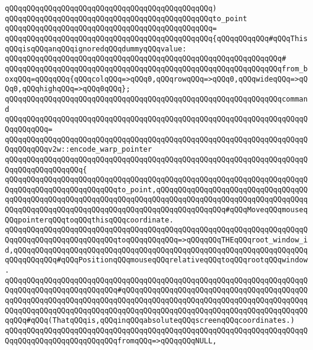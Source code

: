 \verb|qQQqqQQqqQQqqQQqqQQqqQQqqQQqqQQqqQQqqQQqqQQqqQQq)|\newline
\verb|qQQqqQQqqQQqqQQqqQQqqQQqqQQqqQQqqQQqqQQqqQQqqQQqto_point|\newline
\verb|qQQqqQQqqQQqqQQqqQQqqQQqqQQqqQQqqQQqqQQqqQQqqQQq=|\newline
\verb|qQQqqQQqqQQqqQQqqQQqqQQqqQQqqQQqqQQqqQQqqQQqqQQq{qQQqqQQqqQQq#qQQqThisqQQqisqQQqanqQQqignoredqQQqdummyqQQqvalue:|\newline
\verb|qQQqqQQqqQQqqQQqqQQqqQQqqQQqqQQqqQQqqQQqqQQqqQQqqQQqqQQqqQQqqQQq#|\newline
\verb|qQQqqQQqqQQqqQQqqQQqqQQqqQQqqQQqqQQqqQQqqQQqqQQqqQQqqQQqqQQqqQQqfrom_boxqQQq=qQQqqQQq{qQQqcolqQQq=>qQQq0,qQQqrowqQQq=>qQQq0,qQQqwideqQQq=>qQQq0,qQQqhighqQQq=>qQQq0qQQq};|\newline
\newline
\verb|qQQqqQQqqQQqqQQqqQQqqQQqqQQqqQQqqQQqqQQqqQQqqQQqqQQqqQQqqQQqqQQqcommand|\newline
\verb|qQQqqQQqqQQqqQQqqQQqqQQqqQQqqQQqqQQqqQQqqQQqqQQqqQQqqQQqqQQqqQQqqQQqqQQqqQQqqQQq=|\newline
\verb|qQQqqQQqqQQqqQQqqQQqqQQqqQQqqQQqqQQqqQQqqQQqqQQqqQQqqQQqqQQqqQQqqQQqqQQqqQQqqQQqv2w::encode_warp_pointer|\newline
\verb|qQQqqQQqqQQqqQQqqQQqqQQqqQQqqQQqqQQqqQQqqQQqqQQqqQQqqQQqqQQqqQQqqQQqqQQqqQQqqQQqqQQqqQQq{|\newline
\verb|qQQqqQQqqQQqqQQqqQQqqQQqqQQqqQQqqQQqqQQqqQQqqQQqqQQqqQQqqQQqqQQqqQQqqQQqqQQqqQQqqQQqqQQqqQQqqQQqto_point,qQQqqQQqqQQqqQQqqQQqqQQqqQQqqQQqqQQqqQQqqQQqqQQqqQQqqQQqqQQqqQQqqQQqqQQqqQQqqQQqqQQqqQQqqQQqqQQqqQQqqQQqqQQqqQQqqQQqqQQqqQQqqQQqqQQqqQQqqQQqqQQqqQQqqQQqqQQq#qQQqMoveqQQqmouseqQQqpointerqQQqtoqQQqthisqQQqcoordinate.|\newline
\verb|qQQqqQQqqQQqqQQqqQQqqQQqqQQqqQQqqQQqqQQqqQQqqQQqqQQqqQQqqQQqqQQqqQQqqQQqqQQqqQQqqQQqqQQqqQQqqQQqtoqQQqqQQqqQQq=>qQQqqQQqTHEqQQqroot_window_id,qQQqqQQqqQQqqQQqqQQqqQQqqQQqqQQqqQQqqQQqqQQqqQQqqQQqqQQqqQQqqQQqqQQqqQQqqQQqqQQq#qQQqPositionqQQqmouseqQQqrelativeqQQqtoqQQqrootqQQqwindow.|\newline
\verb|qQQqqQQqqQQqqQQqqQQqqQQqqQQqqQQqqQQqqQQqqQQqqQQqqQQqqQQqqQQqqQQqqQQqqQQqqQQqqQQqqQQqqQQqqQQqqQQq#qQQqqQQqqQQqqQQqqQQqqQQqqQQqqQQqqQQqqQQqqQQqqQQqqQQqqQQqqQQqqQQqqQQqqQQqqQQqqQQqqQQqqQQqqQQqqQQqqQQqqQQqqQQqqQQqqQQqqQQqqQQqqQQqqQQqqQQqqQQqqQQqqQQqqQQqqQQqqQQqqQQqqQQqqQQqqQQqqQQqqQQqqQQq#qQQq(ThatqQQqis,qQQqinqQQqabsoluteqQQqscreenqQQqcoordinates.)|\newline
\verb|qQQqqQQqqQQqqQQqqQQqqQQqqQQqqQQqqQQqqQQqqQQqqQQqqQQqqQQqqQQqqQQqqQQqqQQqqQQqqQQqqQQqqQQqqQQqqQQqfromqQQq=>qQQqqQQqNULL,|\newline
